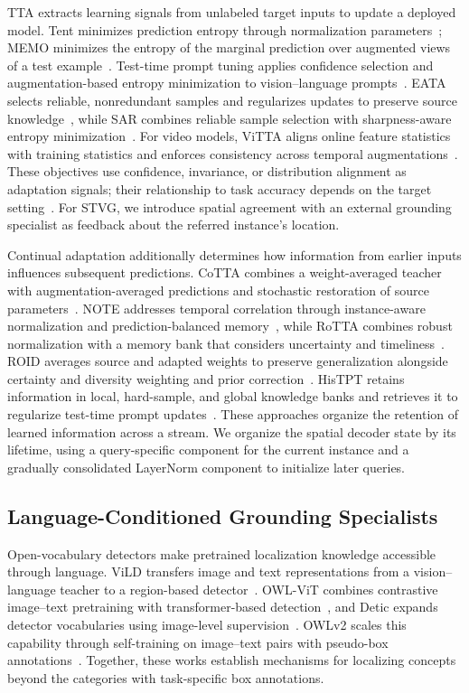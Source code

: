 \documentclass[10pt,twocolumn,letterpaper]{article}
\begin{document}
TTA extracts learning signals from unlabeled target inputs to update a
deployed model.
Tent minimizes prediction entropy through normalization
parameters~\cite{tent}; MEMO minimizes the entropy of the marginal prediction
over augmented views of a test example~\cite{memo}.
Test-time prompt tuning applies confidence selection and augmentation-based
entropy minimization to vision--language prompts~\cite{tpt}.
EATA selects reliable, nonredundant samples and regularizes updates to
preserve source knowledge~\cite{eata}, while SAR combines reliable sample
selection with sharpness-aware entropy minimization~\cite{sar}.
For video models, ViTTA aligns online feature statistics with training
statistics and enforces consistency across temporal
augmentations~\cite{vitta}.
These objectives use confidence, invariance, or distribution alignment as
adaptation signals; their relationship to task accuracy depends on the target
setting~\cite{pitfalls}.
For STVG, we introduce spatial agreement with an external grounding
specialist as feedback about the referred instance's location.

Continual adaptation additionally determines how information from earlier
inputs influences subsequent predictions.
CoTTA combines a weight-averaged teacher with augmentation-averaged
predictions and stochastic restoration of source parameters~\cite{cotta}.
NOTE addresses temporal correlation through instance-aware normalization and
prediction-balanced memory~\cite{note}, while RoTTA combines robust
normalization with a memory bank that considers uncertainty and
timeliness~\cite{rotta}.
ROID averages source and adapted weights to preserve generalization alongside
certainty and diversity weighting and prior correction~\cite{roid}.
HisTPT retains information in local, hard-sample, and global knowledge banks
and retrieves it to regularize test-time prompt updates~\cite{histpt}.
These approaches organize the retention of learned information across a
stream.
We organize the spatial decoder state by its lifetime, using a query-specific
component for the current instance and a gradually consolidated LayerNorm
component to initialize later queries.

\subsection{Language-Conditioned Grounding Specialists}

Open-vocabulary detectors make pretrained localization knowledge accessible
through language.
ViLD transfers image and text representations from a vision--language teacher
to a region-based detector~\cite{vild}.
OWL-ViT combines contrastive image--text pretraining with transformer-based
detection~\cite{owlvit}, and Detic expands detector vocabularies using
image-level supervision~\cite{detic}.
OWLv2 scales this capability through self-training on image--text pairs with
pseudo-box annotations~\cite{owlv2}.
Together, these works establish mechanisms for localizing concepts beyond
the categories with task-specific box annotations.
\end{document}
